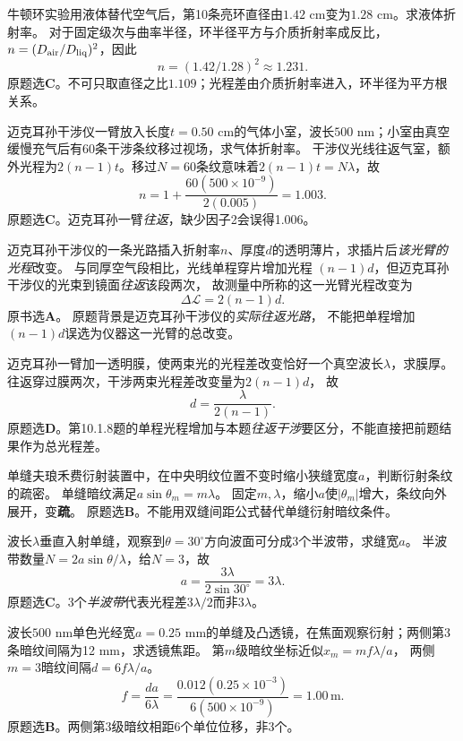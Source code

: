 \problemtext 牛顿环实验用液体替代空气后，第10条亮环直径由$1.42$ cm变为$1.28$ cm。求液体折射率。
\workings
对于固定级次与曲率半径，环半径平方与介质折射率成反比，
$n=(D_{\rm air}/D_{\rm liq})^2$，因此
\[
\boxed{n=(1.42/1.28)^2\approx1.231}.
\]
原题选\textbf{C}。\crosscheck 不可只取直径之比$1.109$；光程差由介质折射率进入，环半径为平方根关系。

\problemtext 迈克耳孙干涉仪一臂放入长度$t=0.50$ cm的气体小室，波长$500$ nm；小室由真空缓慢充气后有60条干涉条纹移过视场，求气体折射率。
\workings
干涉仪光线往返气室，额外光程为$2(n-1)t$。移过$N=60$条纹意味着$2(n-1)t=N\lambda$，故
\[
\boxed{n=1+\frac{60(500\times10^{-9})}{2(0.005)}
=1.003}.
\]
原题选\textbf{C}。\crosscheck 迈克耳孙一臂\emph{往返}，缺少因子2会误得1.006。

\problemtext 迈克耳孙干涉仪的一条光路插入折射率$n$、厚度$d$的透明薄片，求插片后\emph{该光臂的光程}改变。
\workings
与同厚空气段相比，光线单程穿片增加光程
$(n-1)d$，但迈克耳孙干涉仪的光束到镜面\emph{往返}该段两次，
故测量中所称的这一光臂光程改变为
\[
\boxed{\Delta\mathcal L=2(n-1)d}.
\]
原书选\textbf{A}。
\crosscheck 原题背景是迈克耳孙干涉仪的\emph{实际往返光路}，
不能把单程增加$(n-1)d$误选为仪器这一光臂的总改变。

\problemtext 迈克耳孙一臂加一透明膜，使两束光的光程差改变恰好一个真空波长$\lambda$，求膜厚。
\workings
往返穿过膜两次，干涉两束光程差改变量为$2(n-1)d$，
故
\[
\boxed{d=\frac{\lambda}{2(n-1)}}.
\]
原题选\textbf{D}。\crosscheck 第10.1.8题的单程光程增加与本题\emph{往返干涉}要区分，不能直接把前题结果作为总光程差。

\problemtext 单缝夫琅禾费衍射装置中，在中央明纹位置不变时缩小狭缝宽度$a$，判断衍射条纹的疏密。
\workings
单缝暗纹满足$a\sin\theta_m=m\lambda$。
固定$m,\lambda$，缩小$a$使$|\theta_m|$增大，条纹向外展开，变\textbf{疏}。
原题选\textbf{B}。\crosscheck 不能用双缝间距公式替代单缝衍射暗纹条件。

\problemtext 波长$\lambda$垂直入射单缝，观察到$\theta=30^\circ$方向波面可分成3个半波带，求缝宽$a$。
\workings
半波带数量$N=2a\sin\theta/\lambda$，给$N=3$，故
\[
\boxed{a=\frac{3\lambda}{2\sin30^\circ}=3\lambda}.
\]
原题选\textbf{C}。\crosscheck 3个\emph{半波带}代表光程差$3\lambda/2$而非$3\lambda$。

\problemtext 波长$500$ nm单色光经宽$a=0.25$ mm的单缝及凸透镜，在焦面观察衍射；两侧第3条暗纹间隔为12 mm，求透镜焦距。
\workings
第$m$级暗纹坐标近似$x_m=mf\lambda/a$，
两侧$m=3$暗纹间隔$d=6f\lambda/a$。
\[
\boxed{f=\frac{da}{6\lambda}
=\frac{0.012(0.25\times10^{-3})}{6(500\times10^{-9})}
=1.00\,\mathrm m}.
\]
原题选\textbf{B}。\crosscheck 两侧第3级暗纹相距$6$个单位位移，非$3$个。

